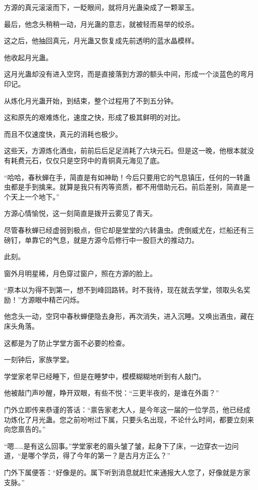 \begin{this_body}
方源的真元滚滚而下，一眨眼间，就将月光蛊染成了一颗翠玉。

最后，他念头稍稍一动，月光蛊的意志，就被轻而易举的绞杀。

这之后，他抽回真元，月光蛊又恢复成先前透明的蓝水晶模样。

他收起月光蛊。

这月光蛊却没有进入空窍，而是直接落到方源的额头中间，形成一个淡蓝色的弯月印记。

从炼化月光蛊开始，到结束，整个过程用了不到五分钟。

这和原先的艰难炼化，速度之快，形成了极其鲜明的对比。

而且不仅速度快，真元的消耗也极少。

这些天，方源炼化酒虫，前前后后足足消耗了六块元石。但是这一晚，他根本就没有耗费元石，仅仅只是空窍中的青铜真元海见了底。

“哈哈，春秋蝉在手，简直是有如神助！今后只要用它的气息镇压，任何的一转蛊虫都是手到擒来。就算是我只有丙等资质，都不用借助元石。前后差别，简直是一个天上一个地下。”

方源心情愉悦，这一刻简直是拨开云雾见了青天。

尽管春秋蝉已经虚弱到极点，但它却是堂堂的六转蛊虫。虎倒威尤在，烂船还有三磅钉，单靠它的气息，就是方源今后修行中一股巨大的推动力。

此刻。

窗外月明星稀，月色穿过窗户，照在方源的脸上。

“原本以为得不到第一，想不到峰回路转。时不我待，现在就去学堂，领取头名奖励！”方源眼中精芒闪烁。

他念头一动，空窍中春秋蝉便隐去身形，再次消失，进入沉睡。又唤出酒虫，藏在床头角落。

这都是为了防止学堂方面不必要的检查。

一刻钟后，家族学堂。

学堂家老早已经睡下，但是在睡梦中，模模糊糊地听到有人敲门。

他被敲门声吵醒，睁开双眼，有些不悦：“三更半夜的，是谁在外面？”

门外立即传来恭谨的答话：“禀告家老大人，是今年这一届的一位学员，他已经成功炼化了月光蛊。您之前吩咐过下属，只要头名出现，不论什么时间，都要立刻来向您禀告的。”

“嗯……是有这么回事。”学堂家老的眉头皱了皱，起身下了床，一边穿衣一边问道，“是哪个学员，得了今年的第一？是古月方正么？”

门外下属便答：“好像是的。属下听到消息就赶忙来通报大人您了，好像就是方家支脉。”


\end{this_body}
